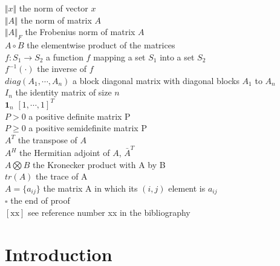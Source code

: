 \documentclass[11pt, a4paper, oneside, openany, reqno]{book}
\theoremstyle{definition}
\theoremstyle{remark}
\numberwithin{equation}{chapter} %
\newcommand{\ONE}{\textbf{1}}
\begin{document}
\begin{tabbing}
	$ \Vert x \Vert $ \> the norm of vector $ x $\\
	$ \Vert A \Vert $ \> the norm of matrix $ A $ \\
	$ \Vert A \Vert_F $ \> the Frobenius norm of matrix $ A $ \\
	$ A \circ B $	\> the elementwise product of the matrices\\ 
	$ f : S_1 \rightarrow S_2 $ \> a function $ f $ mapping a set $ S_1 $ into a set $ S_2 $\\
	$ f^{-1}(\cdot) $ \> the inverse of $ f $\\
	$ diag(A_1,\cdots,A_n) $ \> a block diagonal matrix with diagonal blocks $ A_1 $ to $ A_n $\\
	$ I_n $ \> the identity matrix of size $ n $ \\
	$ \ONE_n $ \> $ [1, \cdots, 1]^T $ \\
	$ P > 0 $ \> a positive definite matrix P \\
	$ P \geq 0 $ \> a positive semidefinite matrix P \\
	$ A^T $  \> the transpose of $ A $ \\
	$ A^H $  \> the Hermitian adjoint of $ A $, $ \bar{A}^T $ \\
	$ A \bigotimes B $ \> the Kronecker product with A by B\\
	$ tr(A) $ \> the trace of A\\
	$ A = \lbrace a_{ij} \rbrace $ \> the matrix A in which its $ (i,j) $ element is $ a_{ij} $ \\
	$ \square $ \> the end of proof\\
	$ \left[ \mathrm{xx} \right] $ \> see reference number xx in the bibliography \\
\end{tabbing}

\newpage\thispagestyle{empty}\mbox{}\newpage

\mainmatter
\lhead{\leftmark} %




\chapter{Introduction}
\end{document}
